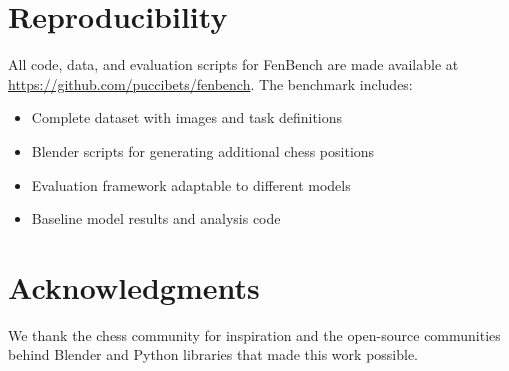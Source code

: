 \documentclass{article}
\begin{document}
\section{Reproducibility}

All code, data, and evaluation scripts for FenBench are made available at \url{https://github.com/puccibets/fenbench}. The benchmark includes:

\begin{itemize}
    \item Complete dataset with images and task definitions
    \item Blender scripts for generating additional chess positions  
    \item Evaluation framework adaptable to different models
    \item Baseline model results and analysis code
\end{itemize}

\section{Acknowledgments}
We thank the chess community for inspiration and the open-source communities behind Blender and Python libraries that made this work possible.



\end{document}
